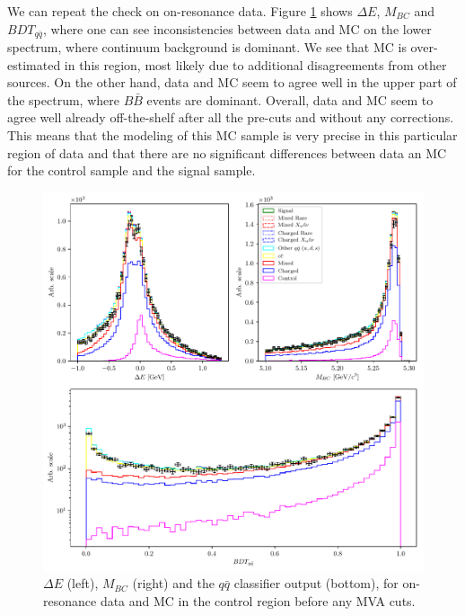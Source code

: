 We can repeat the check on on-resonance data. Figure \ref{fig:onres_control} shows $\Delta E$, $M_{BC}$ and $BDT_{q \bar q}$, where one can see inconsistencies between data and MC on the lower spectrum, where continuum background is dominant. We see that MC is over-estimated in this region, most likely due to additional disagreements from other sources. On the other hand, data and MC seem to agree well in the upper part of the spectrum, where $B \bar B$ events are dominant. Overall, data and MC seem to agree well already off-the-shelf after all the pre-cuts and without any corrections. This means that the modeling of this MC sample is very precise in this particular region of data and that there are no significant differences between data an MC for the control sample and the signal sample.
\begin{figure}[H]
\centering
\captionsetup{width=0.8\linewidth}
\includegraphics[width=\linewidth]{fig/onres_control}
\caption{$\Delta E$ (left), $M_{BC}$ (right) and the $q \bar q$ classifier output (bottom), for on-resonance data and MC in the control region before any MVA cuts.}
\label{fig:onres_control}
\end{figure}